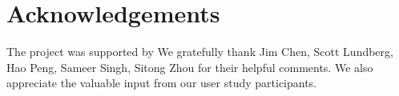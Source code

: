 \section*{Acknowledgements}
The project was supported by 
We gratefully thank Jim Chen, Scott Lundberg, Hao Peng, Sameer Singh, Sitong Zhou for their helpful comments.
We also appreciate the valuable input from our user study participants.

